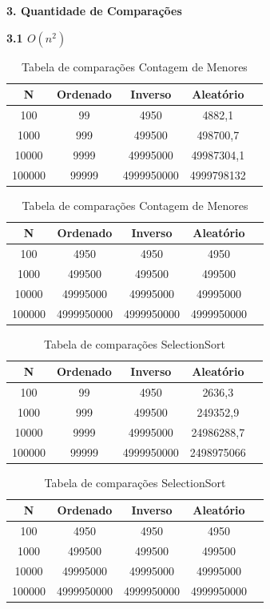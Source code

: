 \documentclass[10pt]{article}
\begin{document}
\vspace{0.25cm}

\textbf{3. Quantidade de Comparações}

\vspace{0.5cm}

\textbf{3.1 $O(n^2)$}

\begin{table}[H]
  \parbox{.45\linewidth}{
    \centering
    \caption{Tabela de comparações BubbleSort}
    \begin{tabular}{|c|c|c|c|c|}
    \hline
    N & Ordenado & Inverso & Aleatório \\ \hline
    100 & 99 & 4950 & 4882,1 \\ \hline
    1000 & 999 & 499500 & 498700,7 \\ \hline
    10000 & 9999 & 49995000 & 49987304,1 \\ \hline
    100000 & 99999 & 4999950000 & 4999798132 \\ \hline
    \end{tabular}
  }
  \hfill
  \parbox{.45\linewidth}{
    \centering
    \caption{Tabela de comparações Contagem de Menores}
    \begin{tabular}{|c|c|c|c|c|}
    \hline
    N & Ordenado & Inverso & Aleatório \\ \hline
    100 & 4950 & 4950 & 4950 \\ \hline
    1000 & 499500 & 499500 & 499500 \\ \hline
    10000 & 49995000 & 49995000 & 49995000 \\ \hline
    100000 & 4999950000 & 4999950000 & 4999950000 \\ \hline
    \end{tabular}
  }
\end{table}

\begin{table}[H]
  \parbox{.45\linewidth}{
    \centering
    \caption{Tabela de comparações InsertionSort}
    \begin{tabular}{|c|c|c|c|c|}
    \hline
    N & Ordenado & Inverso & Aleatório \\ \hline
    100 & 99 & 4950 & 2636,3 \\ \hline
    1000 & 999 & 499500 & 249352,9 \\ \hline
    10000 & 9999 & 49995000 & 24986288,7 \\ \hline
    100000 & 99999 & 4999950000 & 2498975066 \\ \hline
    \end{tabular}
  }
  \hfill
  \parbox{.45\linewidth}{
    \centering
    \caption{Tabela de comparações SelectionSort}
    \begin{tabular}{|c|c|c|c|c|}
    \hline
    N & Ordenado & Inverso & Aleatório \\ \hline
    100 & 4950 & 4950 & 4950 \\ \hline
    1000 & 499500 & 499500 & 499500 \\ \hline
    10000 & 49995000 & 49995000 & 49995000 \\ \hline
    100000 & 4999950000 & 4999950000 & 4999950000 \\ \hline
    \end{tabular}
  }
\end{table}
\end{document}
